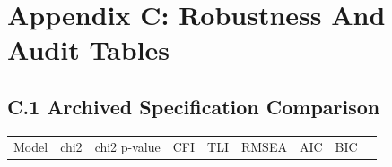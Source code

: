 \documentclass[
  letterpaper,
]{article}
\begin{document}
\section*{Appendix C: Robustness And Audit
Tables}\label{appendix-c-robustness-and-audit-tables}

\subsection{C.1 Archived Specification
Comparison}\label{c.1-archived-specification-comparison}

\begin{longtable}[]{@{}
  >{\raggedright\arraybackslash}p{}
  >{\raggedleft\arraybackslash}p{}
  >{\raggedleft\arraybackslash}p{}
  >{\raggedleft\arraybackslash}p{}
  >{\raggedleft\arraybackslash}p{}
  >{\raggedleft\arraybackslash}p{}
  >{\raggedleft\arraybackslash}p{}
  >{\raggedleft\arraybackslash}p{}
  >{\raggedleft\arraybackslash}p{}@{}}
\toprule\noalign{}
\begin{minipage}[b]{\linewidth}\raggedright
Model
\end{minipage} & \begin{minipage}[b]{\linewidth}\raggedleft
chi2
\end{minipage} & \begin{minipage}[b]{\linewidth}\raggedleft
chi2 p-value
\end{minipage} & \begin{minipage}[b]{\linewidth}\raggedleft
CFI
\end{minipage} & \begin{minipage}[b]{\linewidth}\raggedleft
TLI
\end{minipage} & \begin{minipage}[b]{\linewidth}\raggedleft
RMSEA
\end{minipage} & \begin{minipage}[b]{\linewidth}\raggedleft
AIC
\end{minipage} & \begin{minipage}[b]{\linewidth}\raggedleft
BIC
\end{minipage} & \begin{minipage}[b]{\linewidth}\raggedleft

\end{minipage}
\end{longtable}
\end{document}

